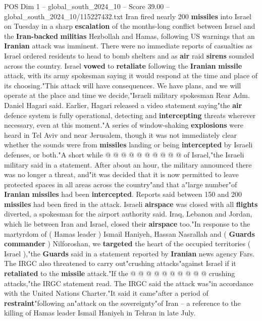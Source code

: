 \begin{textsample}{POS Dim 1 – global\_south\_2024\_10 – Score 39.00 – global\_south\_2024\_10/115227432.txt}  \label{ex:f1_pos_021}
Iran fired nearly 200 \textbf{missiles} into Israel on Tuesday in a sharp \textbf{escalation} of the months-long conflict between Israel and the \textbf{Iran-backed} \textbf{militias} Hezbollah and Hamas, following US warnings that an \textbf{Iranian} attack was imminent.
There were no immediate reports of casualties as Israel ordered residents to head to bomb shelters and as \textbf{air} raid \textbf{sirens} sounded across the country.
Israel \textbf{vowed} to \textbf{retaliate} following the \textbf{Iranian} \textbf{missile} attack, with its army spokesman saying it would respond at the time and place of its choosing."This attack will have consequences.
We have plans, and we will operate at the place and time we decide,"Israeli military spokesman Rear Adm.
Daniel Hagari said.
Earlier, Hagari released a video statement saying"the \textbf{air} defence system is fully operational, detecting and \textbf{intercepting} threats wherever necessary, even at this moment."A series of window-shaking \textbf{explosions} were heard in Tel Aviv and near Jerusalem, though it was not immediately clear whether the sounds were from \textbf{missiles} landing or being \textbf{intercepted} by Israeli defenses, or both."A short while @ @ @ @ @ @ @ @ @ @ of Israel,"the Israeli military said in a statement.
After about an hour, the military announced there was no longer a threat, and"it was decided that it is now permitted to leave protected spaces in all areas across the country"and that a"large number"of \textbf{Iranian} \textbf{missiles} had been \textbf{intercepted}.
Reports said between 150 and 200 \textbf{missiles} had been fired in the attack.
Israeli \textbf{airspace} was closed with all \textbf{flights} diverted, a spokesman for the airport authority said.
Iraq, Lebanon and Jordan, which lie between Iran and Israel, closed their \textbf{airspace} too."In response to the martyrdom of ( Hamas leader ) Ismail Haniyeh, Hassan Nasrallah and ( \textbf{Guards} \textbf{commander} ) Nilforoshan, we \textbf{targeted} the heart of the occupied territories ( Israel ),"the \textbf{Guards} said in a statement reported by \textbf{Iranian} news agency Fars.
The IRGC also threatened to carry out"crushing attacks"against Israel if it \textbf{retaliated} to the \textbf{missile} attack."If the @ @ @ @ @ @ @ @ @ @ crushing attacks,"the IRGC statement read.
The IRGC said the attack was"in accordance with the United Nations Charter."It said it came"after a period of \textbf{restraint}"following an"attack on the sovereignty"of Iran -- a reference to the killing of Hamas leader Ismail Haniyeh in Tehran in late July.

\end{textsample}
